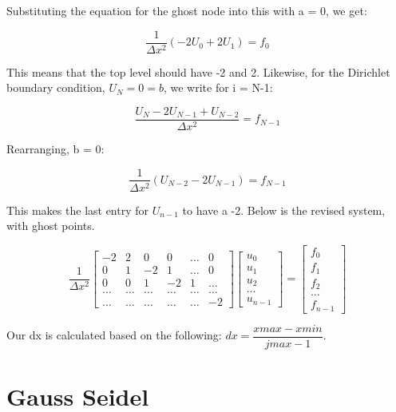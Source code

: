 \documentclass{article}
\begin{document}
Substituting the equation for the ghost node into this with a = 0, we get:

\begin{equation*}
	\dfrac{1}{\Delta x^2}(-2U_0 + 2U_1) = f_0 
\end{equation*}

This means that the top level should have -2 and 2. Likewise, for the Dirichlet boundary condition, $U_N = 0 = b$, we write for i = N-1:

\begin{equation*}
	\dfrac{U_N-2U_{N-1}+U_{N-2}}{\Delta x^2} = f_{N-1}
\end{equation*}

\noindent
Rearranging, b = 0:

\begin{equation*}
	\dfrac{1}{\Delta x^2}(U_{N-2}-2U_{N-1}) = f_{N-1}
\end{equation*}

\noindent
This makes the last entry for $U_{n-1}$ to have a -2. Below is the revised system, with ghost points. 

\[
\dfrac{1}{\Delta x^2}\begin{bmatrix}
-2&2& 0 & 0 & \dots & 0 \\
0&1 & -2 & 1 & \dots & 0 \\
0&0 & 1 & -2 & 1 & \dots \\
\dots  & \dots  & \dots  & \dots & \dots & \dots  \\
\dots & \dots & \dots & \dots & \dots & -2
\end{bmatrix}
\begin{bmatrix}
u_0 \\ u_1 \\ u_2 \\ \dots \\ u_{n-1} 
\end{bmatrix}
=
\begin{bmatrix}
f_0 \\ f_1 \\ f_2 \\ \dots \\ f_{n-1} 
\end{bmatrix}
\]

\noindent
Our dx is calculated based on the following: $dx = \dfrac{xmax-xmin}{jmax-1}$. 

\newpage
\section{Gauss Seidel}
\end{document}
